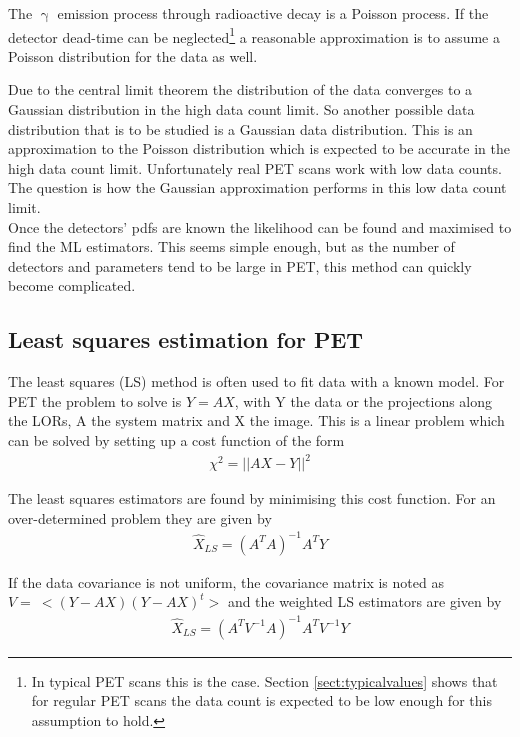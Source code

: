 \documentclass[report,12pt]{report}
\newcounter{theorem}
\begin{document}
The $\upgamma$ emission process through radioactive decay is a Poisson process. If the detector dead-time can be neglected\footnote{In typical PET scans this is the case. Section \ref{sect:typicalvalues} shows that for regular PET scans the data count is expected to be low enough for this assumption to hold.} a reasonable approximation is to assume a Poisson distribution for the data as well. 

Due to the central limit theorem the distribution of the data converges to a Gaussian distribution in the high data count limit. So another possible data distribution that is to be studied is a Gaussian data distribution. This is an approximation to the Poisson distribution which is expected to be accurate in the high data count limit. Unfortunately real PET scans work with low data counts. The question is how the Gaussian approximation performs in this low data count limit.\\

Once the detectors' pdfs are known the likelihood can  be found and maximised to find the ML estimators. This seems simple enough, but as the number of detectors and parameters tend to be large in PET, this method can quickly become complicated.




\subsection{Least squares estimation for PET}
The least squares (LS) method is often used to fit data with a known model. For PET the problem to solve is $Y = AX$, with Y the data or the projections along the LORs, A the system matrix and X the image. This is a linear problem which can be solved by setting up a cost function of the form
\begin{align}
	 \chi^2 = || AX - Y ||^2
\end{align}

The least squares estimators are found by minimising this cost function. For an over-determined problem they are given by \cite{leastsquare}
\begin{align}
	\hat X_{LS} = (A^TA)^{-1}A^TY
\end{align}

If the data covariance is not uniform, the covariance matrix is noted as\\ $V =\ <(Y-AX)(Y-AX)^t>$ and the weighted LS estimators are given by \cite{stat3}
\begin{align}
	\hat X_{LS} = (A^TV^{-1}A)^{-1}A^TV^{-1}Y
\end{align}
\end{document}
